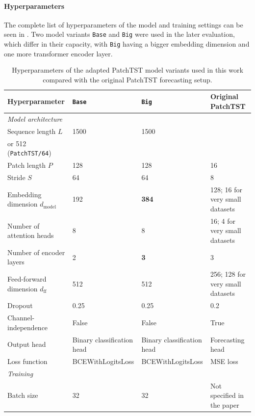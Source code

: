 \paragraph{Hyperparameters}
The complete list of hyperparameters of the model and training settings can be seen in . Two model variants \texttt{Base} and \texttt{Big} were used in the later evaluation, which differ in their capacity, with \texttt{Big} having a bigger embedding dimension and one more transformer encoder layer.
\begin{table}[htbp]
    \centering
    \caption{Hyperparameters of the adapted PatchTST model variants used in this work compared with the original PatchTST forecasting setup.}
    \label{tab:patchtst_hyperparameters}
    \small
    \renewcommand{\arraystretch}{1.15}
    \begin{tabular}{llll}
        \toprule
        \textbf{Hyperparameter} & \texttt{Base} & \texttt{Big} & \textbf{Original PatchTST} \\
        \midrule
        \multicolumn{4}{l}{\textit{Model architecture}} \\
        Sequence length $L$ & 1500 & 1500 & \makecell[l]{336 (\texttt{PatchTST/42})\\or 512 (\texttt{PatchTST/64})} \\
        Patch length $P$ & 128 & 128 & 16 \\
        Stride $S$ & 64 & 64 & 8 \\
        Embedding dimension $d_{\mathrm{model}}$ & 192 & \textbf{384} & 128; 16 for very small datasets \\
        Number of attention heads & 8 & 8 & 16; 4 for very small datasets \\
        Number of encoder layers & 2 & \textbf{3} & 3 \\
        Feed-forward dimension $d_{\mathrm{ff}}$ & 512 & 512 & 256; 128 for very small datasets \\
        Dropout & 0.25 & 0.25 & 0.2 \\
        Channel-independence & False & False & True \\
        Output head & Binary classification head & Binary classification head & Forecasting head \\
        Loss function & BCEWithLogitsLoss & BCEWithLogitsLoss & MSE loss \\
        \midrule
        \multicolumn{4}{l}{\textit{Training}} \\
        Batch size & 32 & 32 & Not specified in the paper \\

\end{tabular}
\end{table}
